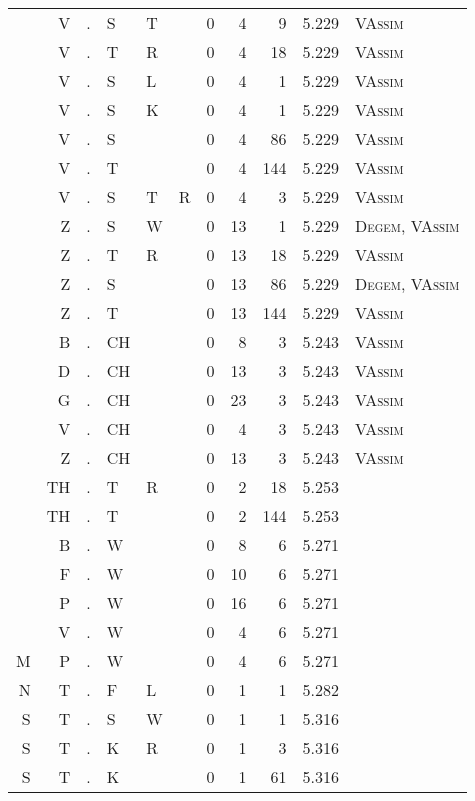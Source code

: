 \begin{longtable}{r@{ } r@{ } c@{ } l@{ } l@{ } l@{ } r r r r l }
  & V & . & S & T &   & 0 & 4 & 9 & 5.229 & \textsc{VAssim} \\
  & V & . & T & R &   & 0 & 4 & 18 & 5.229 & \textsc{VAssim} \\
  & V & . & S & L &   & 0 & 4 & 1 & 5.229 & \textsc{VAssim} \\
  & V & . & S & K &   & 0 & 4 & 1 & 5.229 & \textsc{VAssim} \\
  & V & . & S &   &   & 0 & 4 & 86 & 5.229 & \textsc{VAssim} \\
  & V & . & T &   &   & 0 & 4 & 144 & 5.229 & \textsc{VAssim} \\
  & V & . & S & T & R & 0 & 4 & 3 & 5.229 & \textsc{VAssim} \\
  & Z & . & S & W &   & 0 & 13 & 1 & 5.229 & \textsc{Degem}, \textsc{VAssim} \\
  & Z & . & T & R &   & 0 & 13 & 18 & 5.229 & \textsc{VAssim} \\
  & Z & . & S &   &   & 0 & 13 & 86 & 5.229 & \textsc{Degem}, \textsc{VAssim} \\
  & Z & . & T &   &   & 0 & 13 & 144 & 5.229 & \textsc{VAssim} \\
  & B & . & CH &   &   & 0 & 8 & 3 & 5.243 & \textsc{VAssim} \\
  & D & . & CH &   &   & 0 & 13 & 3 & 5.243 & \textsc{VAssim} \\
  & G & . & CH &   &   & 0 & 23 & 3 & 5.243 & \textsc{VAssim} \\
  & V & . & CH &   &   & 0 & 4 & 3 & 5.243 & \textsc{VAssim} \\
  & Z & . & CH &   &   & 0 & 13 & 3 & 5.243 & \textsc{VAssim} \\
  & TH & . & T & R &   & 0 & 2 & 18 & 5.253 &  \\
  & TH & . & T &   &   & 0 & 2 & 144 & 5.253 &  \\
  & B & . & W &   &   & 0 & 8 & 6 & 5.271 &  \\
  & F & . & W &   &   & 0 & 10 & 6 & 5.271 &  \\
  & P & . & W &   &   & 0 & 16 & 6 & 5.271 &  \\
  & V & . & W &   &   & 0 & 4 & 6 & 5.271 &  \\
M & P & . & W &   &   & 0 & 4 & 6 & 5.271 &  \\
N & T & . & F & L &   & 0 & 1 & 1 & 5.282 &  \\
S & T & . & S & W &   & 0 & 1 & 1 & 5.316 &  \\
S & T & . & K & R &   & 0 & 1 & 3 & 5.316 &  \\
S & T & . & K &   &   & 0 & 1 & 61 & 5.316 &  \\

\end{longtable}
